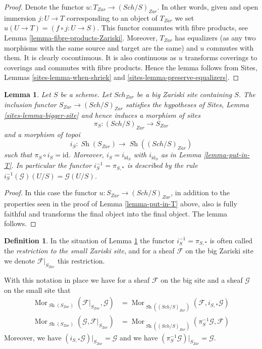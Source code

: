 \documentclass{stacks-project}
\theoremstyle{plain}
\newtheorem{lemma}[subsection]{Lemma}
\theoremstyle{definition}
\newtheorem{definition}[subsection]{Definition}
\theoremstyle{remark}
\numberwithin{equation}{subsection}
\def\Sch{\mathit{Sch}}
\def\Mor{\mathop{\mathrm{Mor}}\nolimits}
\def\Sh{\mathop{\mathit{Sh}}\nolimits}
\begin{document}
\begin{proof}
Denote the functor $u : T_{Zar} \to (\Sch/S)_{Zar}$.
In other words, given and open immersion $j : U \to T$ corresponding
to an object of $T_{Zar}$ we set $u(U \to T) = (f \circ j : U \to S)$.
This functor commutes with fibre products, see
Lemma \ref{lemma-fibre-products-Zariski}.
Moreover, $T_{Zar}$ has equalizers (as any two morphisms with the same
source and target are the same) and $u$ commutes with them.
It is clearly cocontinuous.
It is also continuous as $u$ transforms coverings to coverings and
commutes with fibre products. Hence the lemma follows from
Sites, Lemmas \ref{sites-lemma-when-shriek}
and \ref{sites-lemma-preserve-equalizers}.
\end{proof}

\begin{lemma}
\label{lemma-at-the-bottom}
Let $S$ be a scheme. Let $\Sch_{Zar}$ be a big Zariski
site containing $S$.
The inclusion functor $S_{Zar} \to (\Sch/S)_{Zar}$
satisfies the hypotheses of Sites, Lemma \ref{sites-lemma-bigger-site}
and hence induces a morphism of sites
$$
\pi_S : (\Sch/S)_{Zar} \longrightarrow S_{Zar}
$$
and a morphism of topoi
$$
i_S : \Sh(S_{Zar}) \longrightarrow \Sh((\Sch/S)_{Zar})
$$
such that $\pi_S \circ i_S = \text{id}$. Moreover, $i_S = i_{\text{id}_S}$
with $i_{\text{id}_S}$ as in Lemma \ref{lemma-put-in-T}. In particular the
functor $i_S^{-1} = \pi_{S, *}$ is described by the rule
$i_S^{-1}(\mathcal{G})(U/S) = \mathcal{G}(U/S)$.
\end{lemma}

\begin{proof}
In this case the functor $u : S_{Zar} \to (\Sch/S)_{Zar}$,
in addition to the properties seen in the proof of
Lemma \ref{lemma-put-in-T} above, also is fully faithful
and transforms the final object into the final object.
The lemma follows.
\end{proof}

\begin{definition}
\label{definition-restriction-small-zariski}
In the situation of
Lemma \ref{lemma-at-the-bottom}
the functor $i_S^{-1} = \pi_{S, *}$ is often
called the {\it restriction to the small Zariski site}, and for a sheaf
$\mathcal{F}$ on the big Zariski site we denote $\mathcal{F}|_{S_{Zar}}$
this restriction.
\end{definition}

\noindent
With this notation in place we have for a sheaf $\mathcal{F}$ on the
big site and a sheaf $\mathcal{G}$ on the small site that
\begin{align*}
\Mor_{\Sh(S_{Zar})}(\mathcal{F}|_{S_{Zar}}, \mathcal{G})
& =
\Mor_{\Sh((\Sch/S)_{Zar})}(\mathcal{F},
i_{S, *}\mathcal{G}) \\
\Mor_{\Sh(S_{Zar})}(\mathcal{G}, \mathcal{F}|_{S_{Zar}})
& =
\Mor_{\Sh((\Sch/S)_{Zar})}(\pi_S^{-1}\mathcal{G},
\mathcal{F})
\end{align*}
Moreover, we have $(i_{S, *}\mathcal{G})|_{S_{Zar}} = \mathcal{G}$
and we have $(\pi_S^{-1}\mathcal{G})|_{S_{Zar}} = \mathcal{G}$.
\end{document}
